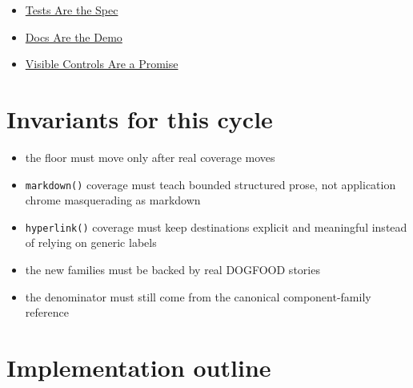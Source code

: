 \begin{itemize}
\tightlist
\item
  \href{https://github.com/flyingrobots/bijou/blob/cbd70612140e7a450d764b3c7be1c6af878b99bc/docs/invariants/tests-are-the-spec.md}{Tests Are the Spec}
\item
  \href{https://github.com/flyingrobots/bijou/blob/cbd70612140e7a450d764b3c7be1c6af878b99bc/docs/invariants/docs-are-the-demo.md}{Docs Are the Demo}
\item
  \href{https://github.com/flyingrobots/bijou/blob/cbd70612140e7a450d764b3c7be1c6af878b99bc/docs/invariants/visible-controls-are-a-promise.md}{Visible Controls Are a Promise}
\end{itemize}

\section{Invariants for this cycle}\label{record-070-invariants-for-this-cycle}

\begin{itemize}
\tightlist
\item
  the floor must move only after real coverage moves
\item
  \texttt{m\allowbreak{}a\allowbreak{}r\allowbreak{}k\allowbreak{}d\allowbreak{}o\allowbreak{}w\allowbreak{}n\allowbreak{}(\allowbreak{})} coverage must teach bounded structured prose, not application chrome masquerading as markdown
\item
  \texttt{h\allowbreak{}y\allowbreak{}p\allowbreak{}e\allowbreak{}r\allowbreak{}l\allowbreak{}i\allowbreak{}n\allowbreak{}k\allowbreak{}(\allowbreak{})} coverage must keep destinations explicit and meaningful instead of relying on generic labels
\item
  the new families must be backed by real DOGFOOD stories
\item
  the denominator must still come from the canonical component-family reference
\end{itemize}

\section{Implementation outline}\label{record-070-implementation-outline}

